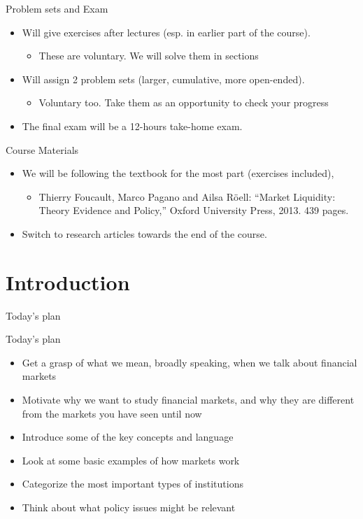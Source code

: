 \begin{frame}{Problem sets and Exam}
\begin{itemize}
	\item Will give exercises after lectures (esp. in earlier part of the course).
	\begin{itemize}
		\item These are voluntary. We will solve them in sections
	\end{itemize}
	\item Will assign 2 problem sets (larger, cumulative, more open-ended).
	\begin{itemize}
		\item Voluntary too. Take them as an opportunity to check your progress
	\end{itemize}
	\item The final exam will be a 12-hours take-home exam.
\end{itemize}
\end{frame}


\begin{frame}{Course Materials}
\begin{itemize}
	\item We will be following the textbook for the most part (exercises included),
	\begin{itemize}
		\item Thierry Foucault, Marco Pagano and Ailsa R{\"o}ell: “Market Liquidity: Theory Evidence and Policy,” Oxford University Press, 2013. 439 pages.
	\end{itemize}
	\item Switch to research articles towards the end of the course.
\end{itemize}
\end{frame}




\section{Introduction}

\begin{frame}{Today's plan}
\tableofcontents[currentsection]
\end{frame}


\begin{frame}{Today's plan}
\begin{itemize}
	\item Get a grasp of what we mean, broadly speaking, when we talk about financial markets
	\item Motivate why we want to study financial markets, and why they are different from the markets you have seen until now
	\item Introduce some of the key concepts and language
	\item Look at some basic examples of how markets work
	\item Categorize the most important types of institutions
	\item Think about what policy issues might be relevant
\end{itemize}
\end{frame}


